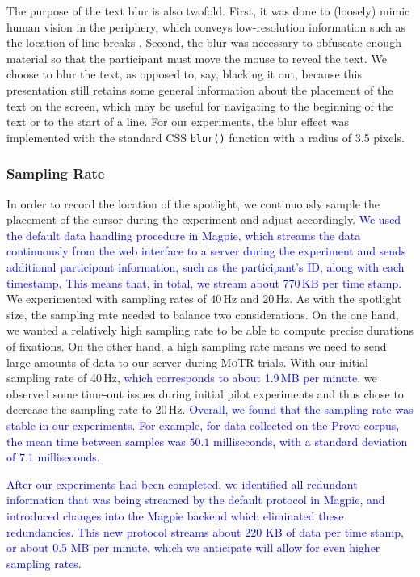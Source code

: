 \documentclass[12pt]{article}
\newcommand{\motr}{\textsc{MoTR}\xspace}
\newcommand{\change}[1]{\textcolor{blue}{#1}}
\begin{document}
The purpose of the text blur is also twofold. First, it was done to (loosely) mimic human vision in the periphery, which conveys low-resolution information such as the location of line breaks \citep{mcconkie1975span, rayner1975perceptual, strasburger2011peripheral}.
Second, the blur was necessary to obfuscate enough material so that the participant must move the mouse to reveal the text. We choose to blur the text, as opposed to, say, blacking it out, because this presentation still retains some general information about the placement of the text on the screen, which may be useful for navigating to the beginning of the text or to the start of a line. For our experiments, the blur effect was implemented with the standard CSS \texttt{blur()} function with a radius of 3.5 pixels.


\subsubsection{Sampling Rate}

In order to record the location of the spotlight, we continuously sample the placement of the cursor during the experiment and adjust accordingly. \change{We used the default data handling procedure in Magpie, which streams the data continuously from the web interface to a server during the experiment and sends additional participant information, such as the participant's ID, along with each timestamp. This means that, in total, we stream about 770\,KB per time stamp.} We experimented with sampling rates of 40\,Hz and 20\,Hz. As with the spotlight size, the sampling rate needed to balance two considerations. On the one hand, we wanted a relatively high sampling rate to be able to compute precise durations of fixations. On the other hand, a high sampling rate means we need to send large amounts of data to our server during \motr trials. With our initial sampling rate of 40\,Hz, \change{which corresponds to about 1.9\,MB per minute,} we observed some time-out issues during initial pilot experiments and thus chose to decrease the sampling rate to 20\,Hz. \change{Overall, we found that the sampling rate was stable in our experiments. For example, for data collected on the Provo corpus, the mean time between samples was $50.1$ milliseconds, with a standard deviation of $7.1$ milliseconds.}

\change{After our experiments had been completed, we identified all redundant information that was being streamed by the default protocol in Magpie, and introduced changes into the Magpie backend which eliminated these redundancies. This new protocol streams about 220 KB of data per time stamp, or about 0.5 MB per minute, which we anticipate will allow for even higher sampling rates.}
\end{document}
